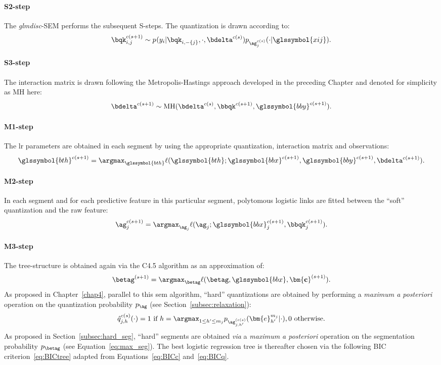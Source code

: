 \paragraph{S2-step} The \textit{glmdisc}-SEM performs the subsequent S-steps. The quantization is drawn according to:
\[ \bqk_{i,j}^{c(s+1)} \sim p_{}(y_i | \bqk_{i,-\{j\}}, \cdot, \bdelta^{c(s)}) p_{\ag_j^{c(s)}}(\cdot | \glssymbol{xij}). \]
\paragraph{S3-step} The interaction matrix is drawn following the Metropolis-Hastings approach developed in the preceding Chapter and denoted for simplicity as MH here:
\[ \bdelta^{c(s+1)} \sim \text{MH}(\bdelta^{c(s)}, \bbqk^{c(s+1)}, \glssymbol{bby}^{c(s+1)}). \]
\paragraph{M1-step} The \gls{lr} parameters are obtained in each segment by using the appropriate quantization, interaction matrix and observations:
\[ \glssymbol{bth}^{c(s+1)} = \argmax_{\glssymbol{bth}} \ell(\glssymbol{bth};\glssymbol{bbx}^{c(s+1)},\glssymbol{bby}^{c(s+1)}, \bdelta^{c(s+1)}). \]
\paragraph{M2-step} In each segment and for each predictive feature in this particular segment, polytomous logistic links are fitted between the ``soft'' quantization and the raw feature:
\[ \ag_j^{c(s+1)} = \argmax_{\ag_j} \ell(\ag_j;\glssymbol{bbx}_j^{c(s+1)},\bbqk_j^{c(s+1)}). \]
\paragraph{M3-step} The tree-structure is obtained again via the C4.5 algorithm as an approximation of:
\[ \betag^{(s+1)} = \argmax_{\betag} \ell(\betag, \glssymbol{bbx}, \mathbf{\bm{c}}^{(s+1)}). \]
As proposed in Chapter~\ref{chap4}, parallel to this \gls{sem} algorithm, ``hard'' quantizations are obtained by performing a \textit{maximum a posteriori} operation on the quantization probability $p_{\ag}$ (see Section~\ref{subsec:relaxation}):
\[ \hat{q}_{j,h}^{c(s)}(\cdot) = 1 \text{ if } h = \argmax_{1 \leq h' \leq m_j} p_{{\ag}_{j,h'}^{(c(s)}}(\bm{e}_{h'}^{m_j} | \cdot), 0 \text{ otherwise.} \]
As proposed in Section~\ref{subsec:hard_seg}, ``hard'' segments are obtained \textit{via} a \textit{maximum a posteriori} operation on the segmentation probability $p_{\betag}$ (see Equation~\eqref{eq:max_seg}). The best logistic regression tree is thereafter chosen via the following BIC criterion~\eqref{eq:BICtree} adapted from Equations~\eqref{eq:BICc} and~\eqref{eq:BICq}.

